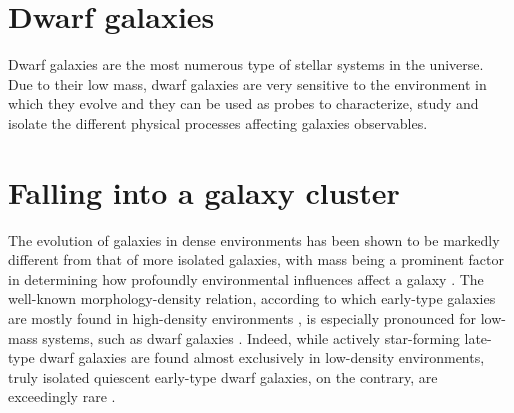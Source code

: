 \section{Dwarf galaxies}
Dwarf galaxies are the most numerous type of stellar systems in the universe.
Due to their low mass, dwarf galaxies are very sensitive to the environment in which they evolve and they can be used as probes to characterize, study and isolate the different physical processes affecting galaxies observables.


\section{Falling into a galaxy cluster}

The evolution of galaxies in dense environments has been shown to be markedly different from that of more isolated galaxies, with mass being a prominent factor in determining how profoundly environmental influences affect a galaxy \citep{Boselli2006, Grossi2018a}.
The well-known morphology-density relation, according to which early-type galaxies are mostly found in high-density environments \citep{Dressler1980, Dressler1997}, is especially pronounced for low-mass systems, such as dwarf galaxies \citep{McConnachie2012}.
Indeed, while actively star-forming late-type dwarf galaxies are found almost exclusively in low-density environments, truly isolated quiescent early-type dwarf galaxies, on the contrary, are exceedingly rare \citep{Binggeli1990, Karachentseva2010, Geha2012}.

